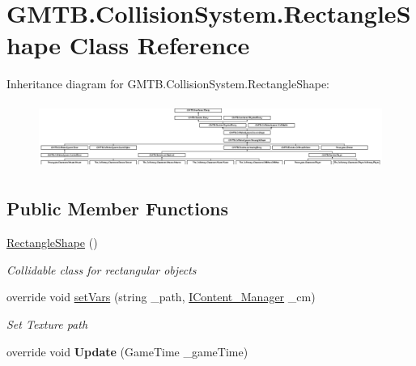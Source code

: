 \hypertarget{class_g_m_t_b_1_1_collision_system_1_1_rectangle_shape}{}\section{G\+M\+T\+B.\+Collision\+System.\+Rectangle\+Shape Class Reference}
\label{class_g_m_t_b_1_1_collision_system_1_1_rectangle_shape}
Inheritance diagram for G\+M\+T\+B.\+Collision\+System.\+Rectangle\+Shape\+:\begin{figure}[H]
\begin{center}
\leavevmode
\includegraphics[height=2.154882cm]{class_g_m_t_b_1_1_collision_system_1_1_rectangle_shape}
\end{center}
\end{figure}
\subsection*{Public Member Functions}
\begin{DoxyCompactItemize}
\item 
\mbox{\hyperlink{class_g_m_t_b_1_1_collision_system_1_1_rectangle_shape_a4fe79dc84506739797375a1c35f188d2}{Rectangle\+Shape}} ()
\begin{DoxyCompactList}\small\item\em Collidable class for rectangular objects \end{DoxyCompactList}\item 
override void \mbox{\hyperlink{class_g_m_t_b_1_1_collision_system_1_1_rectangle_shape_aeb763e34b0be4dff6f0e67fb623bb246}{set\+Vars}} (string \+\_\+path, \mbox{\hyperlink{interface_g_m_t_b_1_1_interfaces_1_1_i_content___manager}{I\+Content\+\_\+\+Manager}} \+\_\+cm)
\begin{DoxyCompactList}\small\item\em Set Texture path \end{DoxyCompactList}\item 
\mbox{\label{class_g_m_t_b_1_1_collision_system_1_1_rectangle_shape_a0d68b1aa6ca91f4ca7f9b33b1a05e134}} 
override void {\bfseries Update} (Game\+Time \+\_\+game\+Time)
\end{DoxyCompactItemize}
